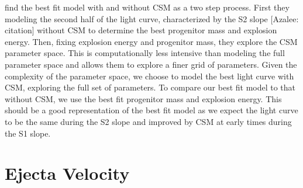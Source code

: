 \documentclass[preprint]{aastex61}
\newcommand{\azaleecomment}[1]{{\color{red} [{#1}]}}
\newcommand{\Azalee}[1]{\azaleecomment{Azalee: #1}}
\begin{document}
\citet{2018morozova} find the best fit model with and without CSM as a two step process. 
First they modeling the second half of the light curve, characterized by the S2 slope \Azalee{citation} without CSM to determine the best progenitor mass and explosion energy. 
Then, fixing explosion energy and progenitor mass, they explore the CSM parameter space. 
This is computationally less intensive than modeling the full parameter space and allows them to explore a finer grid of parameters.
Given the complexity of the parameter space, we choose to model the best light curve with CSM, exploring the full set of parameters. 
To compare our best fit model to that without CSM, we use the best fit progenitor mass and explosion energy. 
This should be a good representation of the best fit model as we expect the light curve to be the same during the S2 slope and improved by CSM at early times during the S1 slope.

\section{Ejecta Velocity}
\end{document}
